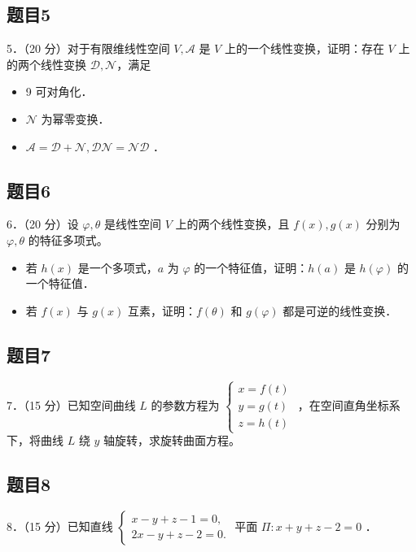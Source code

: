\documentclass{article}
\begin{document}
\subsection{题目5}
5．（20 分）对于有限维线性空间 \(V, \mathcal{A}\) 是 \(V\) 上的一个线性变换，证明：存在 \(V\) 上的两个线性变换 \(\mathcal{D}, \mathcal{N}\)，满足

\begin{itemize}
  \item[（1）] 9 可对角化．
  \item[（2）] \(\mathcal{N}\) 为幂零变换．
  \item[（3）] \(\mathcal{A}=\mathcal{D}+\mathcal{N}, \mathcal{D} \mathcal{N}=\mathcal{N} \mathcal{D}\) ．
\end{itemize}

\subsection{题目6}
6．（20 分）设 \(\varphi, \theta\) 是线性空间 \(V\) 上的两个线性变换，且 \(f(x), g(x)\) 分别为 \(\varphi, \theta\) 的特征多项式。

\begin{itemize}
  \item[（1）] 若 \(h(x)\) 是一个多项式，\(a\) 为 \(\varphi\) 的一个特征值，证明：\(h(a)\) 是 \(h(\varphi)\) 的一个特征值．
  \item[（2）] 若 \(f(x)\) 与 \(g(x)\) 互素，证明：\(f(\theta)\) 和 \(g(\varphi)\) 都是可逆的线性变换．
\end{itemize}

\subsection{题目7}
7．（15 分）已知空间曲线 \(L\) 的参数方程为 \(\left\{\begin{array}{l}x=f(t) \\ y=g(t) \\ z=h(t)\end{array}\right.\) ，在空间直角坐标系下，将曲线 \(L\) 绕 \(y\) 轴旋转，求旋转曲面方程。

\subsection{题目8}
8．（15 分）已知直线 \(\left\{\begin{array}{l}x-y+z-1=0, \\ 2 x-y+z-2=0 .\end{array}\right.\) 平面 \(\Pi: x+y+z-2=0\) ．
\end{document}
